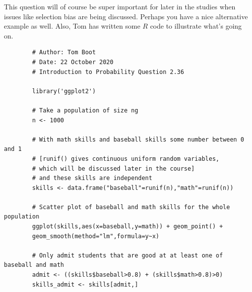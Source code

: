 

\setcounter{theorem}{35}
\begin{exercise}[BH.2.36]
\begin{solution}
    This question will of course be super important for later in the studies when issues like selection bias are being discussed. Perhaps you have a nice alternative example as well. Also, Tom has written some $R$ code to illustrate what's going on.
    \begin{verbatim}
        # Author: Tom Boot
        # Date: 22 October 2020
        # Introduction to Probability Question 2.36

        library('ggplot2')

        # Take a population of size ng
        n <- 1000

        # With math skills and baseball skills some number between 0 and 1
        # [runif() gives continuous uniform random variables,
        # which will be discussed later in the course]
        # and these skills are independent
        skills <- data.frame("baseball"=runif(n),"math"=runif(n))

        # Scatter plot of baseball and math skills for the whole population
        ggplot(skills,aes(x=baseball,y=math)) + geom_point() +
        geom_smooth(method="lm",formula=y~x)

        # Only admit students that are good at at least one of baseball and math
        admit <- ((skills$baseball>0.8) + (skills$math>0.8)>0)
        skills_admit <- skills[admit,]


\end{verbatim}
\end{solution}
\end{exercise}

